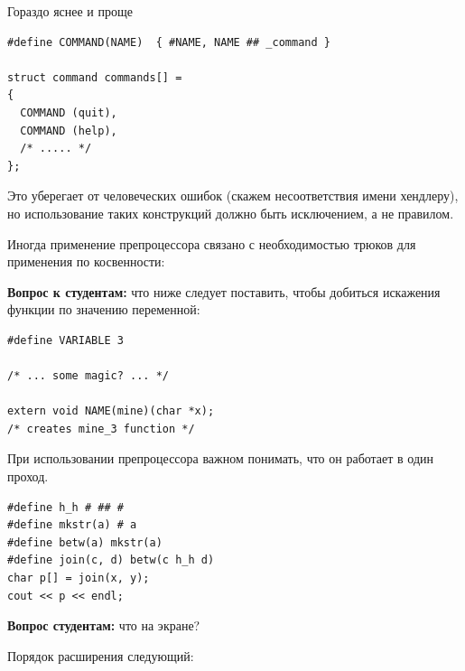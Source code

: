 \documentclass[a4paper,12pt,oneside]{book}
\newif\ifanswers
\begin{document}
Гораздо яснее и проще

\begin{lstlisting}
#define COMMAND(NAME)  { #NAME, NAME ## _command }
     
struct command commands[] =
{
  COMMAND (quit),
  COMMAND (help),
  /* ..... */
};
\end{lstlisting}

Это уберегает от человеческих ошибок (скажем несоответствия имени хендлеру), но использование таких конструкций должно быть исключением, а не правилом.

Иногда применение препроцессора связано с необходимостью трюков для применения по косвенности:

\textbf{Вопрос к студентам:} что ниже следует поставить, чтобы добиться искажения функции по значению переменной:

\begin{lstlisting}
#define VARIABLE 3

/* ... some magic? ... */

extern void NAME(mine)(char *x);
/* creates mine_3 function */
\end{lstlisting}

\ifanswers
Правильный ответ должен включать не менее трёх уровней косвенности:

\begin{lstlisting}
#define PASTER(x,y) x ## _ ## y
#define EVALUATOR(x,y)  PASTER(x,y)
#define NAME(fun) EVALUATOR(fun, VARIABLE)
\end{lstlisting}

Порядок расширения макросов следующий:

\begin{lstlisting}
NAME(mine)
EVALUATOR(mine, VARIABLE)
PASTER(mine, 3)
\end{lstlisting}

Поэтому пропустить хотя бы один уровень косвенности здесь нельзя.
\fi

При использовании препроцессора важном понимать, что он работает в один проход.

\begin{lstlisting}
#define h_h # ## #
#define mkstr(a) # a
#define betw(a) mkstr(a)
#define join(c, d) betw(c h_h d)
char p[] = join(x, y);
cout << p << endl;
\end{lstlisting}

\textbf{Вопрос студентам:} что на экране?

\ifanswers
Порядок расширения следующий:
\end{document}
